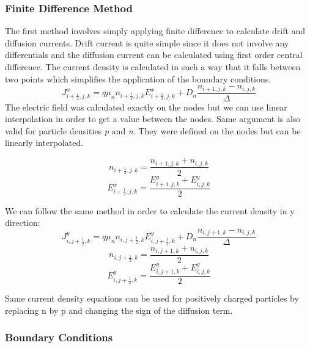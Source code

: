 \subsubsection{Finite Difference Method}
The first method involves simply applying finite difference to calculate drift and diffusion currents. Drift current is quite simple since it does not involve any differentials and the diffusion current can be calculated using first order central difference. The current density is calculated in such a way that it falls between two points which simplifies the application of the boundary conditions.
\begin{equation}
J^x_{i+\frac{1}{2},j,k}=q\mu_n n_{i+\frac{1}{2},j,k} E^x_{i+\frac{1}{2},j,k}+D_n \frac{n_{i+1,j,k}-n_{i,j,k}}{\Delta}
\end{equation}
The electric field was calculated exactly on the nodes but we can use linear interpolation in order to get a value between the nodes. Same argument is also valid for particle densities \textit{p} and \textit{n}. They were defined on the nodes but can be linearly interpolated.

\begin{equation}\nonumber
n_{i+\frac{1}{2},j,k}=\frac{n_{i+1,j,k}+n_{i,j,k}}{2}
\end{equation}
\begin{equation}\nonumber
E^{x}_{i+\frac{1}{2},j,k}=\frac{E^y_{i+1,j,k}+E^y_{i,j,k}}{2}
\end{equation}

We can follow the same method in order to calculate the current density in y direction:
\begin{equation}
J^y_{i,j+\frac{1}{2},k}=q\mu_n n_{i,j+\frac{1}{2},k} E^y_{i,j+\frac{1}{2},k}+D_n \frac{n_{i,j+1,k}-n_{i,j,k}}{\Delta}
\end{equation}
\begin{equation}\nonumber
n_{i,j+\frac{1}{2},k}=\frac{n_{i,j+1,k}+n_{i,j,k}}{2}
\end{equation}
\begin{equation}\nonumber
E^{y}_{i,j+\frac{1}{2},k}=\frac{E^y_{i,j+1,k}+E^y_{i,j,k}}{2}
\end{equation}

Same current density equations can be used for positively charged particles by replacing n by p and changing the sign of the diffusion term.


\subsubsection{Boundary Conditions}

